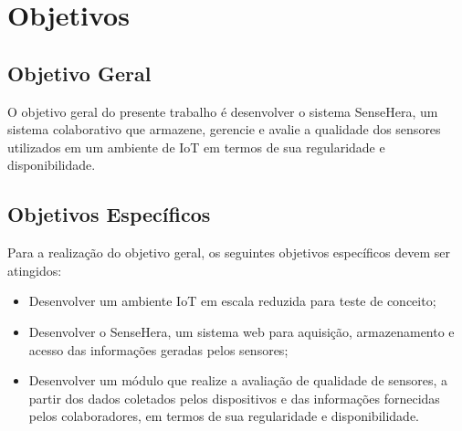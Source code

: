 \section{Objetivos}
\label{sec:objetivo}
\subsection{Objetivo Geral}
\qquad O objetivo geral do presente trabalho é desenvolver o sistema SenseHera, um sistema colaborativo que armazene, gerencie e avalie a qualidade dos sensores utilizados em um ambiente de \acrlong{IoT} em termos de sua regularidade e disponibilidade.
\subsection{Objetivos Específicos}
Para a realização do objetivo geral, os seguintes objetivos específicos devem ser atingidos:
\begin{itemize}
  \item Desenvolver um ambiente \acrshort{IoT} em escala reduzida para teste de conceito;
  \item Desenvolver o SenseHera, um sistema web para aquisição, armazenamento e acesso das informações geradas pelos sensores;
  \item Desenvolver um módulo que realize a avaliação de qualidade de sensores, a partir dos dados coletados pelos dispositivos e das informações fornecidas pelos colaboradores, em termos de sua regularidade e disponibilidade.
\end{itemize}
